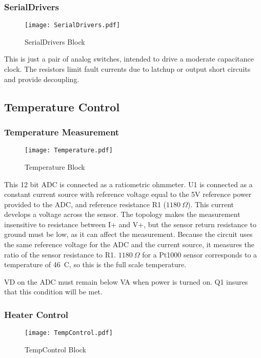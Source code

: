 \subsubsection{SerialDrivers}
   \begin{figure}
   \begin{center}
   \texttt{[image: SerialDrivers.pdf]}
   \end{center}
   \caption{SerialDrivers Block}
   \end{figure}
   
This is just a pair of analog switches, intended to drive a moderate capacitance clock. The resistors limit fault currents due to latchup or output short circuits and provide decoupling.

\subsection{Temperature Control}

\subsubsection{Temperature Measurement}
   \begin{figure}
   \begin{center}
   \texttt{[image: Temperature.pdf]}
   \end{center}
   \caption{Temperature Block}
   \end{figure}
   
This 12 bit ADC is connected as a ratiometric ohmmeter. U1 is connected as a constant current source with reference voltage equal to the 5V reference power provided to the ADC, and reference resistance R1 ($1180\ \Omega$). This current develops a voltage across the sensor. The topology makes the measurement insensitive to resistance between I+ and V+, but the sensor return resistance to ground must be low, as it can affect the measurement. Because the circuit uses the same reference voltage for the ADC and the current source, it measures the ratio of the sensor resistance to R1. $1180\ \Omega$ for a Pt1000 sensor corresponds to a temperature of 46\ C, so this is the full scale temperature.

VD on the ADC must remain below VA when power is turned on. Q1 insures that this condition will be met.

\subsubsection{Heater Control}
   \begin{figure}
   \begin{center}
   \texttt{[image: TempControl.pdf]}
   \end{center}
   \caption{TempControl Block}
   \end{figure}

